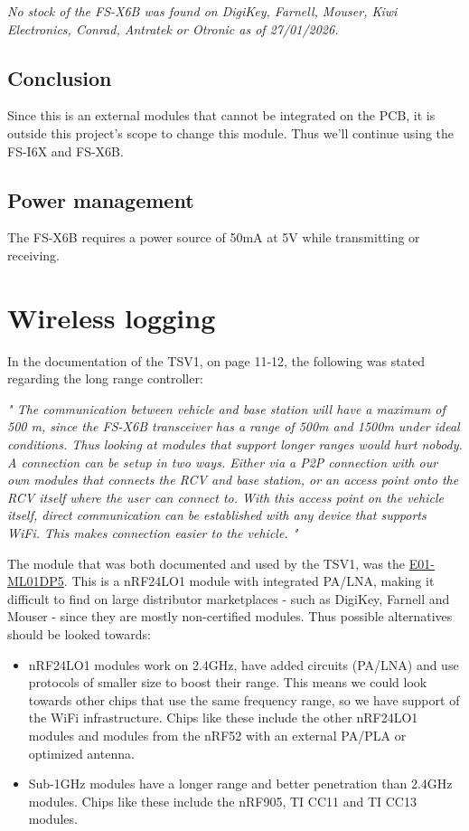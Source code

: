 \documentclass[ti,oneside,10pt]{uantwerpenreport}
\newcommand{\Quoting}[1]{\textit{"#1"}}
\newcommand{\RmLstWS}[0]{\vspace{-6pt}} %
\begin{document}
\noindent\textit{No stock of the FS-X6B was found on DigiKey, Farnell, Mouser, Kiwi Electronics, Conrad, Antratek or Otronic as of 27/01/2026.}
\subsection{Conclusion}
Since this is an external modules that cannot be integrated on the PCB, it is outside this project's scope to change this module.
Thus we'll continue using the FS-I6X and FS-X6B.
\subsection{Power management}
The FS-X6B requires a power source of 50mA at 5V while transmitting or receiving.
\section{Wireless logging}
\label{sec:LRC}
In the documentation of the TSV1, on page 11-12, the following was stated regarding the long range controller:

\Quoting{
    The communication between vehicle and base station will have a maximum of 500 m, since the FS-X6B transceiver has a range of 500m and 1500m under ideal conditions.
    Thus looking at modules that support longer ranges would hurt nobody.
    \hfill \break \break
    A connection can be setup in two ways.
    Either via a P2P connection with our own modules that connects the RCV and base station, or an access point onto the RCV itself where the user can connect to. 
    With this access point on the vehicle itself, direct communication can be established with any device that supports WiFi.
    This makes connection easier to the vehicle.
}

The module that was both documented and used by the TSV1, was the \href{https://nl.aliexpress.com/item/32783191387.html?spm=a2g0o.productlist.main.1.2bd17c8dH32Wl0&algo_pvid=7b9f4ab4-a0f9-48ab-8d7f-c15a7c529146&algo_exp_id=7b9f4ab4-a0f9-48ab-8d7f-c15a7c529146-0&pdp_npi=4%40dis%21EUR%215.57%213.46%21%21%215.69%213.53%21%402103}{E01-ML01DP5}.
This is a nRF24LO1 module with integrated PA/LNA, making it difficult to find on large distributor marketplaces - such as DigiKey, Farnell and Mouser - since they are mostly non-certified modules.
Thus possible alternatives should be looked towards:
\RmLstWS
\begin{itemize}
    \item nRF24LO1 modules work on 2.4GHz, have added circuits (PA/LNA) and use protocols of smaller size to boost their range.
    This means we could look towards other chips that use the same frequency range, so we have support of the WiFi infrastructure.
    Chips like these include the other nRF24LO1 modules and modules from the nRF52 with an external PA/PLA or optimized antenna.
    \item Sub-1GHz modules have a longer range and better penetration than 2.4GHz modules.
    Chips like these include the nRF905, TI CC11 and TI CC13 modules.
\end{itemize}
\end{document}
